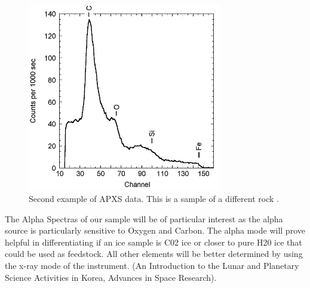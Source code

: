 \documentclass[%
 portrait,
 aapm,
 mph,%
 amsmath,amssymb,
 reprint,%
]{revtex4-2}
\begin{document}
\begin{figure}
  \includegraphics[width=240pt]{Instruments/APXSdata02.png}
   \caption{Second example of APXS data. This is a sample of a different rock \cite{bruckner2003refined}.}
\end{figure} 

The Alpha Spectras of our sample will be of particular interest as the alpha source is particularly sensitive to Oxygen and Carbon. The alpha mode will prove helpful in differentiating if an ice sample is C02 ice or closer to pure H20 ice that could be used as feedstock. 
All other elements will be better determined by using the x-ray mode of the instrument. (An Introduction to the Lunar and Planetary Science Activities in Korea, Advances in Space Research). 
\end{document}
